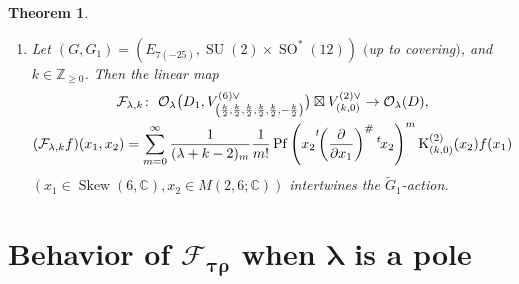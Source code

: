 \documentclass[pdftex]{sigma}
\numberwithin{equation}{section}
\newtheorem{Theorem}{Theorem}[section]
\newcommand{\BZ}{\mathbb{Z}}
\newcommand{\BC}{\mathbb{C}}
\newcommand{\cF}{\mathcal{F}}
\newcommand{\cO}{\mathcal{O}}
\newcommand{\rK}{\mathrm{K}}
\newcommand{\Pf}{\operatorname{Pf}}
\newcommand{\Skew}{\operatorname{Skew}}
\begin{document}
\begin{Theorem}
\begin{enumerate}
\item[$(3)$] Let $(G,G_1)=(E_{7(-25)}, \operatorname{SU}(2)\times \operatorname{SO}^*(12))$ $($up to covering$)$, and $k\in\BZ_{\ge 0}$.
Then the linear map
\begin{gather*}
\cF_{\lambda,k}\colon \ \cO_{\lambda}\big(D_1,V_{\left(\frac{k}{2},\frac{k}{2},\frac{k}{2},\frac{k}{2},\frac{k}{2},-\frac{k}{2}\right)}^{(6)\vee}\big)
\boxtimes V_{(k,0)}^{(2)\vee}\to \cO_\lambda(D), \\
(\cF_{\lambda,k}f)(x_1,x_2)=\sum_{m=0}^\infty \frac{1}{(\lambda+k-2)_m}\frac{1}{m!}
\Pf\left(x_2{\vphantom{\Bigl(}}^t\!\!\left(\frac{\partial}{\partial x_1}\right)^\#{}^t\hspace{-1pt}x_2\right)^m\rK_{(k,0)}^{(2)}(x_2)f(x_1)
\end{gather*}
$(x_1\in\Skew(6,\BC),x_2\in M(2,6;\BC))$ intertwines the $\tilde{G}_1$-action.
\end{enumerate}
\end{Theorem}

\section[Behavior of $\cF_{\tau\rho}$ when $\lambda$ is a pole]{Behavior of $\boldsymbol{\cF_{\tau\rho}}$ when $\boldsymbol{\lambda}$ is a pole}\label{section6}
\end{document}
